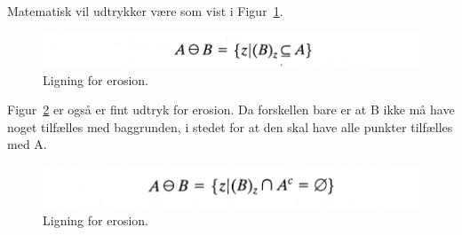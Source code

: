 Matematisk vil udtrykker være som vist i Figur~\ref{fig:erosioneq1}. 

\begin{figure}[H]
	\centering
	\includegraphics[width=0.7\linewidth]{figs/spm09/erosioneq1}
	\caption{Ligning for erosion.}
	\label{fig:erosioneq1}
\end{figure}

Figur~\ref{fig:erosioneq2} er også er fint udtryk for erosion. Da forskellen bare er at B ikke må have noget tilfælles med baggrunden, i stedet for at den skal have alle punkter tilfælles med A.

\begin{figure}[H]
	\centering
	\includegraphics[width=0.66\linewidth]{figs/spm09/erosioneq2}
	\caption{Ligning for erosion.}
	\label{fig:erosioneq2}
\end{figure}
